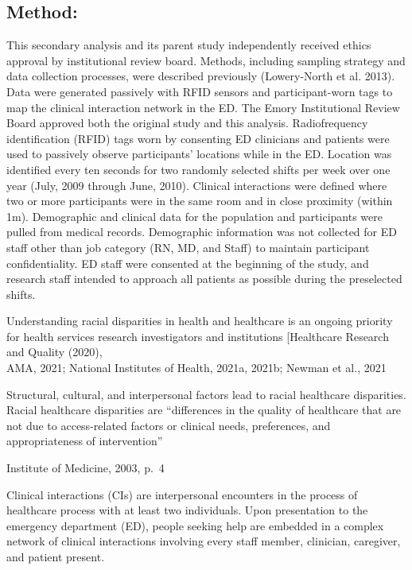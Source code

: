 \documentclass[
]{article}
\begin{document}
\hypertarget{method}{%
\subsection{Method:}\label{method}}

This secondary analysis and its parent study independently received
ethics approval by institutional review board. Methods, including
sampling strategy and data collection processes, were described
previously (Lowery-North et al. 2013). Data were generated passively
with RFID sensors and participant-worn tags to map the clinical
interaction network in the ED. The Emory Institutional Review Board
approved both the original study and this analysis. Radiofrequency
identification (RFID) tags worn by consenting ED clinicians and patients
were used to passively observe participants' locations while in the ED.
Location was identified every ten seconds for two randomly selected
shifts per week over one year (July, 2009 through June, 2010). Clinical
interactions were defined where two or more participants were in the
same room and in close proximity (within 1m). Demographic and clinical
data for the population and participants were pulled from medical
records. Demographic information was not collected for ED staff other
than job category (RN, MD, and Staff) to maintain participant
confidentiality. ED staff were consented at the beginning of the study,
and research staff intended to approach all patients as possible during
the preselected shifts.

Understanding racial disparities in health and healthcare is an ongoing
priority for health services research investigators and institutions
{[}Healthcare Research and Quality (2020),\\
AMA, 2021; National Institutes of Health, 2021a, 2021b; Newman et al.,
2021

Structural, cultural, and interpersonal factors lead to racial
healthcare disparities. Racial healthcare disparities are ``differences
in the quality of healthcare that are not due to access-related factors
or clinical needs, preferences, and appropriateness of intervention''

Institute of Medicine, 2003, p.~4

Clinical interactions (CIs) are interpersonal encounters in the process
of healthcare process with at least two individuals. Upon presentation
to the emergency department (ED), people seeking help are embedded in a
complex network of clinical interactions involving every staff member,
clinician, caregiver, and patient present.
\end{document}
